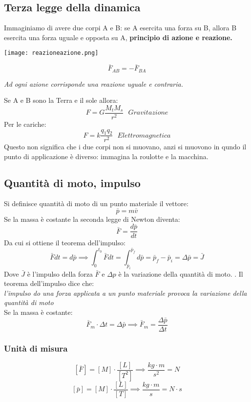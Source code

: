 \documentclass[../../main.tex]{subfiles}
\begin{document}
\subsection{Terza legge della dinamica}
Immaginiamo di avere due corpi A e B: se A esercita una forza su B, allora B esercita una forza uguale e opposta su A, \textbf{principio di azione e reazione.}\\
\begin{minipage}{0.5\textwidth}
    \centering
    \texttt{[image: reazioneazione.png]}
\end{minipage}
\begin{minipage}{0.5\textwidth}
    \centering
    \[\bar F_{AB} = -\bar F_{BA}\]
\end{minipage}
\begin{center}
    \textit{Ad ogni azione corrisponde una reazione uguale e contraria.}\\
\end{center}
Se A e B sono la Terra e il sole allora:
\[
    F = G \dfrac{M_t M_s}{r^2} \ \ \ \textit{Gravitazione}
\]
Per le cariche:
\[
    F = k \dfrac{q_1 q_2}{r^2} \ \ \ \textit{Elettromagnetica}
\]
Questo non significa che i due corpi non si muovano, anzi si muovono in qundo il punto di applicazione è diverso: immagina la roulotte e la macchina.
\subsection{Quantità di moto, impulso}
Si definisce quantità di moto di un punto materiale il vettore:
\[
    \bar p = m\bar v
\]
Se la massa è costante la seconda legge di Newton diventa:
\[
    \bar F = \dfrac{d\bar p}{dt}
\]
Da cui si ottiene il teorema dell'impulso:
\[
    \bar F dt = d\bar p \implies \int_{0}^{t_0} \bar F dt = \int_{\bar p_i}^{\bar p_f} d\bar p = \bar p_f - \bar p_i = \Delta\bar p = \bar J
\]
Dove $\bar J$ è l'impulso della forza $\bar F$ e $\Delta p$ è la variazione della quantità di moto. . Il teorema dell'impulso dice che:\\
\textit{l'impulso do una forza applicata a un punto materiale provoca la variazione della quantità di moto}\\
Se la massa è costante:
\[
    \bar F_m \cdot \Delta t = \Delta \bar p \implies \bar F_m = \dfrac{\Delta\bar p}{\Delta t}
\]
\subsubsection{Unità di misura}
\[
    [\bar F] = [M]\cdot\dfrac{[L]}{[T^2]} \implies \dfrac{kg\cdot m}{s^2} = N
\]
\[
    [\bar p] = [M]\cdot\dfrac{[L]}{[T]} \implies \dfrac{kg\cdot m}{s} = N\cdot s
\]
\end{document}
